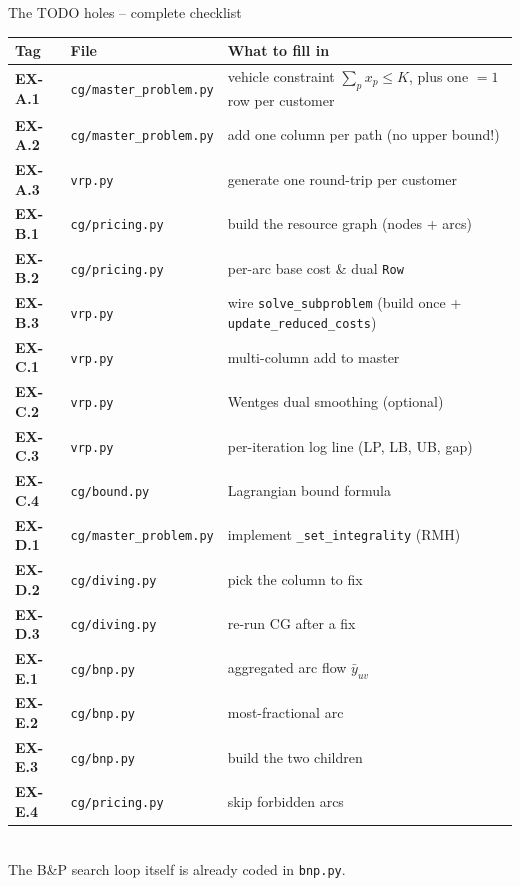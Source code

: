 \documentclass[10pt,aspectratio=169]{beamer}
\begin{document}
\begin{frame}{The TODO holes -- complete checklist}
  \tiny
  \begin{tabular}{@{}lll@{}}
    \toprule
    Tag & File & What to fill in \\
    \midrule
    \textbf{EX-A.1} & \texttt{cg/master\_problem.py} & vehicle constraint $\sum_p x_p\!\le\!K$, plus one $=\!1$ row per customer \\
    \textbf{EX-A.2} & \texttt{cg/master\_problem.py} & add one column per path (no upper bound!) \\
    \textbf{EX-A.3} & \texttt{vrp.py} & generate one round-trip per customer \\
    \midrule
    \textbf{EX-B.1} & \texttt{cg/pricing.py} & build the resource graph (nodes + arcs) \\
    \textbf{EX-B.2} & \texttt{cg/pricing.py} & per-arc base cost \& dual \texttt{Row} \\
    \textbf{EX-B.3} & \texttt{vrp.py} & wire \texttt{solve\_subproblem} (build once + \texttt{update\_reduced\_costs}) \\
    \midrule
    \textbf{EX-C.1} & \texttt{vrp.py} & multi-column add to master \\
    \textbf{EX-C.2} & \texttt{vrp.py} & Wentges dual smoothing (optional) \\
    \textbf{EX-C.3} & \texttt{vrp.py} & per-iteration log line (LP, LB, UB, gap) \\
    \textbf{EX-C.4} & \texttt{cg/bound.py} & Lagrangian bound formula \\
    \midrule
    \textbf{EX-D.1} & \texttt{cg/master\_problem.py} & implement \texttt{\_set\_integrality} (RMH) \\
    \textbf{EX-D.2} & \texttt{cg/diving.py} & pick the column to fix \\
    \textbf{EX-D.3} & \texttt{cg/diving.py} & re-run CG after a fix \\
    \midrule
    \textbf{EX-E.1} & \texttt{cg/bnp.py} & aggregated arc flow $\bar y_{uv}$ \\
    \textbf{EX-E.2} & \texttt{cg/bnp.py} & most-fractional arc \\
    \textbf{EX-E.3} & \texttt{cg/bnp.py} & build the two children \\
    \textbf{EX-E.4} & \texttt{cg/pricing.py} & skip forbidden arcs \\
    \bottomrule
  \end{tabular}
  \smallskip\\
  \scriptsize The B\&P search loop itself is \alert{already coded} in \texttt{bnp.py}.
\end{frame}
\end{document}
